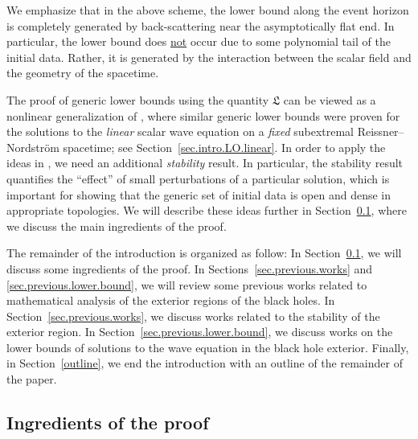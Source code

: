 \documentclass[10pt, reqno]{amsart}
\theoremstyle{definition}
\theoremstyle{remark}
\theoremstyle{conjecture}
\numberwithin{equation}{section}
\newcommand{\0}{\emptyset}
\begin{document}
We emphasize that in the above scheme, the lower bound along the event horizon is completely generated by back-scattering near the asymptotically flat end. In particular, the lower bound does \underline{not} occur due to some polynomial tail of the initial data. Rather, it is generated by the interaction between the scalar field and the geometry of the spacetime.

The proof of generic lower bounds using the quantity $\mathfrak L$ can be viewed as a nonlinear generalization of \cite{LO.instab}, where similar generic lower bounds were proven for the solutions to the \emph{linear} scalar wave equation on a \emph{fixed} subextremal Reissner--Nordstr\"om spacetime; see Section~\ref{sec.intro.LO.linear}. In order to apply the ideas in \cite{LO.instab}, we need an additional \emph{stability} result. In particular, the stability result quantifies the ``effect'' of small perturbations of a particular solution, which is important for showing that the generic set of initial data is open and dense in appropriate topologies. We will describe these ideas further in Section~\ref{sec.ingredients}, where we discuss the main ingredients of the proof.

The remainder of the introduction is organized as follow: In Section~\ref{sec.ingredients}, we will discuss some ingredients of the proof. In Sections~\ref{sec.previous.works} and \ref{sec.previous.lower.bound}, we will review some previous works related to mathematical analysis of the exterior regions of the black holes. In Section~\ref{sec.previous.works}, we discuss works related to the stability of the exterior region. In Section~\ref{sec.previous.lower.bound}, we discuss works on the lower bounds of solutions to the wave equation in the black hole exterior. Finally, in Section~\ref{outline}, we end the introduction with an outline of the remainder of the paper.

\subsection{Ingredients of the proof}\label{sec.ingredients}
\end{document}
